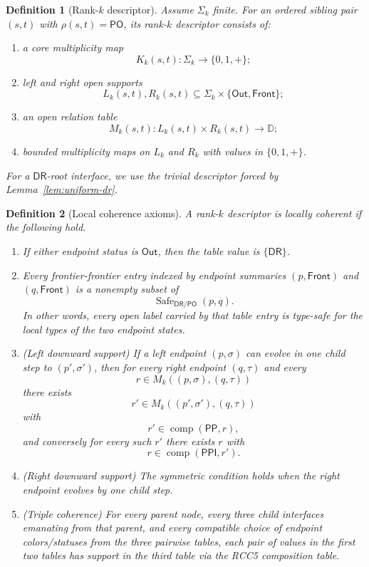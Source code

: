 \documentclass[11pt]{article}
\newtheorem{definition}{Definition}[section]
\theoremstyle{remark}
\newcommand{\DR}{\mathsf{DR}}
\newcommand{\PO}{\mathsf{PO}}
\newcommand{\PP}{\mathsf{PP}}
\newcommand{\PPI}{\mathsf{PPI}}
\newcommand{\comp}{\operatorname{comp}}
\newcommand{\Out}{\mathsf{Out}}
\newcommand{\Front}{\mathsf{Front}}
\newcommand{\OpenDom}{\mathbb{D}}
\begin{document}
\begin{definition}[Rank-$k$ descriptor]\label{def:descriptor-full}
Assume $\Sigma_k$ finite. For an ordered sibling pair $(s,t)$ with $\rho(s,t)=\PO$, its rank-$k$ descriptor consists of:
\begin{enumerate}[label=(\roman*)]
    \item a core multiplicity map
    \[
    K_k(s,t):\Sigma_k\to\{0,1,+\};
    \]
    \item left and right open supports
    \[
    L_k(s,t),R_k(s,t)\subseteq \Sigma_k\times\{\Out,\Front\};
    \]
    \item an open relation table
    \[
    M_k(s,t):L_k(s,t)\times R_k(s,t)\to\OpenDom;
    \]
    \item bounded multiplicity maps on $L_k$ and $R_k$ with values in $\{0,1,+\}$.
\end{enumerate}
For a $\DR$-root interface, we use the trivial descriptor forced by Lemma~\ref{lem:uniform-dr}.
\end{definition}

\begin{definition}[Local coherence axioms]\label{def:coherence}
A rank-$k$ descriptor is \emph{locally coherent} if the following hold.
\begin{enumerate}[label=(C\arabic*)]
    \item If either endpoint status is $\Out$, then the table value is $\{\DR\}$.
    \item Every frontier-frontier entry indexed by endpoint summaries $(p,\Front)$ and $(q,\Front)$ is a nonempty subset of
    \[
    \operatorname{Safe}_{\DR/\PO}(p,q).
    \]
    In other words, every open label carried by that table entry is type-safe for the local types of the two endpoint states.
    \item (Left downward support) If a left endpoint $(p,\sigma)$ can evolve in one child step to $(p',\sigma')$, then for every right endpoint $(q,\tau)$ and every
    \[
    r\in M_k((p,\sigma),(q,\tau))
    \]
    there exists
    \[
    r'\in M_k((p',\sigma'),(q,\tau))
    \]
    with
    \[
    r'\in \comp(\PP,r),
    \]
    and conversely for every such $r'$ there exists $r$ with
    \[
    r\in \comp(\PPI,r').
    \]
    \item (Right downward support) The symmetric condition holds when the right endpoint evolves by one child step.
    \item (Triple coherence) For every parent node, every three child interfaces emanating from that parent, and every compatible choice of endpoint colors/statuses from the three pairwise tables, each pair of values in the first two tables has support in the third table via the RCC5 composition table.
\end{enumerate}
\end{definition}
\end{document}

